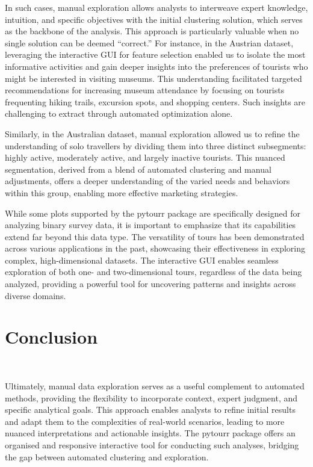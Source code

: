 \documentclass[article]{ajs}
\begin{document}
In such cases, manual exploration allows analysts to interweave expert knowledge, intuition, and specific objectives with the initial clustering solution, which serves as the backbone of the analysis. This approach is particularly valuable when no single solution can be deemed “correct.” For instance, in the Austrian dataset, leveraging the interactive GUI for feature selection enabled us to isolate the most informative activities and gain deeper insights into the preferences of tourists who might be interested in visiting museums. This understanding facilitated targeted recommendations for increasing museum attendance by focusing on tourists frequenting hiking trails, excursion spots, and shopping centers. Such insights are challenging to extract through automated optimization alone.

Similarly, in the Australian dataset, manual exploration allowed us to refine the understanding of solo travellers by dividing them into three distinct subsegments: highly active, moderately active, and largely inactive tourists. This nuanced segmentation, derived from a blend of automated clustering and manual adjustments, offers a deeper understanding of the varied needs and behaviors within this group, enabling more effective marketing strategies.

While some plots supported by the pytourr package are specifically designed for analyzing binary survey data, it is important to emphasize that its capabilities extend far beyond this data type. The versatility of tours has been demonstrated across various applications in the past, showcasing their effectiveness in exploring complex, high-dimensional datasets. The interactive GUI enables seamless exploration of both one- and two-dimensional tours, regardless of the data being analyzed, providing a powerful tool for uncovering patterns and insights across diverse domains.


\section{Conclusion}~\label{conclusion}

Ultimately, manual data exploration serves as a useful complement to automated methods, providing the flexibility to incorporate context, expert judgment, and specific analytical goals. This approach enables analysts to refine initial results and adapt them to the complexities of real-world scenarios, leading to more nuanced interpretations and actionable insights. The pytourr package offers an organised and responsive interactive tool for conducting such analyses, bridging the gap between automated clustering and exploration.
\end{document}
